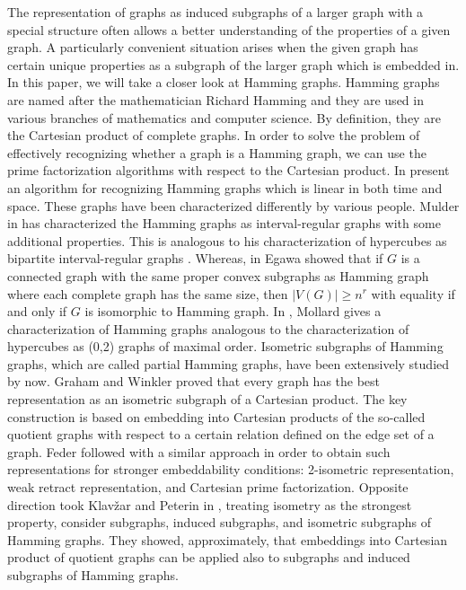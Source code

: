 \documentclass[12pt,a4paper,titlepage,openany]{report}
\begin{document}
The representation of graphs as induced subgraphs of a larger graph with a special structure often allows a better understanding of the properties of a given graph. A particularly convenient situation arises when the given graph has certain unique properties as a subgraph of the larger graph which is embedded in. In this paper, we will take a closer look at Hamming graphs. Hamming graphs are named after the mathematician Richard Hamming and they are used in various branches of mathematics and computer science. By definition, they are the Cartesian product of complete graphs. In order to solve the problem of effectively recognizing whether a graph is a Hamming graph, we can use the prime factorization algorithms with respect to the Cartesian product. In \cite{Imrich} present an algorithm for recognizing Hamming graphs which is linear in both time and space.\newline
These graphs have been characterized differently by various people. Mulder in \cite{Mulder} has characterized the Hamming graphs as interval-regular graphs with some additional properties. This is analogous to his characterization of hypercubes as bipartite interval-regular graphs \cite{Mulder}. Whereas, in \cite{Egawa} Egawa showed that if $G$ is a connected graph with the same proper convex subgraphs as Hamming graph where each complete graph has the same size, then $|V(G)|\geq n^r$ with equality if and only if $G$ is isomorphic to Hamming graph. In \cite{Mollard}, Mollard gives a characterization of Hamming graphs analogous to the characterization of hypercubes as (0,2) graphs of maximal order. Isometric subgraphs of Hamming graphs, which are called partial Hamming graphs, have been extensively studied by now. \newline
Graham and Winkler \cite{Winkler} proved that every graph has the best representation as an isometric subgraph of a Cartesian product. The key construction is based on embedding into Cartesian products of the so-called quotient graphs with respect to a certain relation defined on the edge set of a graph. Feder \cite{Feder} followed with a similar approach in order to obtain such representations for stronger embeddability conditions: 2-isometric representation, weak retract representation, and Cartesian prime factorization. Opposite direction took Klav\v zar and Peterin in \cite{Iztok}, treating isometry as the strongest property, consider subgraphs, induced subgraphs, and isometric subgraphs of Hamming graphs. They showed, approximately, that embeddings into Cartesian product of quotient graphs can be applied also to subgraphs and induced subgraphs of Hamming graphs.\newline
\end{document}
